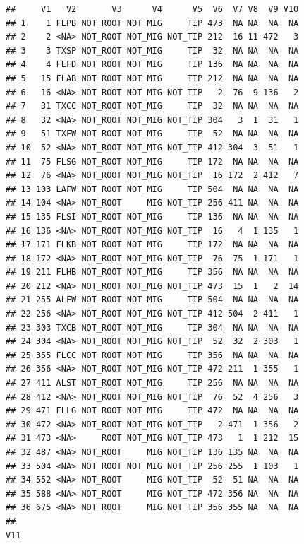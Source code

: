 \documentclass[]{article}
\begin{document}
\begin{verbatim}
##     V1   V2       V3      V4      V5  V6  V7 V8  V9 V10
## 1    1 FLPB NOT_ROOT NOT_MIG     TIP 473  NA NA  NA  NA
## 2    2 <NA> NOT_ROOT NOT_MIG NOT_TIP 212  16 11 472   3
## 3    3 TXSP NOT_ROOT NOT_MIG     TIP  32  NA NA  NA  NA
## 4    4 FLFD NOT_ROOT NOT_MIG     TIP 136  NA NA  NA  NA
## 5   15 FLAB NOT_ROOT NOT_MIG     TIP 212  NA NA  NA  NA
## 6   16 <NA> NOT_ROOT NOT_MIG NOT_TIP   2  76  9 136   2
## 7   31 TXCC NOT_ROOT NOT_MIG     TIP  32  NA NA  NA  NA
## 8   32 <NA> NOT_ROOT NOT_MIG NOT_TIP 304   3  1  31   1
## 9   51 TXFW NOT_ROOT NOT_MIG     TIP  52  NA NA  NA  NA
## 10  52 <NA> NOT_ROOT NOT_MIG NOT_TIP 412 304  3  51   1
## 11  75 FLSG NOT_ROOT NOT_MIG     TIP 172  NA NA  NA  NA
## 12  76 <NA> NOT_ROOT NOT_MIG NOT_TIP  16 172  2 412   7
## 13 103 LAFW NOT_ROOT NOT_MIG     TIP 504  NA NA  NA  NA
## 14 104 <NA> NOT_ROOT     MIG NOT_TIP 256 411 NA  NA  NA
## 15 135 FLSI NOT_ROOT NOT_MIG     TIP 136  NA NA  NA  NA
## 16 136 <NA> NOT_ROOT NOT_MIG NOT_TIP  16   4  1 135   1
## 17 171 FLKB NOT_ROOT NOT_MIG     TIP 172  NA NA  NA  NA
## 18 172 <NA> NOT_ROOT NOT_MIG NOT_TIP  76  75  1 171   1
## 19 211 FLHB NOT_ROOT NOT_MIG     TIP 356  NA NA  NA  NA
## 20 212 <NA> NOT_ROOT NOT_MIG NOT_TIP 473  15  1   2  14
## 21 255 ALFW NOT_ROOT NOT_MIG     TIP 504  NA NA  NA  NA
## 22 256 <NA> NOT_ROOT NOT_MIG NOT_TIP 412 504  2 411   1
## 23 303 TXCB NOT_ROOT NOT_MIG     TIP 304  NA NA  NA  NA
## 24 304 <NA> NOT_ROOT NOT_MIG NOT_TIP  52  32  2 303   1
## 25 355 FLCC NOT_ROOT NOT_MIG     TIP 356  NA NA  NA  NA
## 26 356 <NA> NOT_ROOT NOT_MIG NOT_TIP 472 211  1 355   1
## 27 411 ALST NOT_ROOT NOT_MIG     TIP 256  NA NA  NA  NA
## 28 412 <NA> NOT_ROOT NOT_MIG NOT_TIP  76  52  4 256   3
## 29 471 FLLG NOT_ROOT NOT_MIG     TIP 472  NA NA  NA  NA
## 30 472 <NA> NOT_ROOT NOT_MIG NOT_TIP   2 471  1 356   2
## 31 473 <NA>     ROOT NOT_MIG NOT_TIP 473   1  1 212  15
## 32 487 <NA> NOT_ROOT     MIG NOT_TIP 136 135 NA  NA  NA
## 33 504 <NA> NOT_ROOT NOT_MIG NOT_TIP 256 255  1 103   1
## 34 552 <NA> NOT_ROOT     MIG NOT_TIP  52  51 NA  NA  NA
## 35 588 <NA> NOT_ROOT     MIG NOT_TIP 472 356 NA  NA  NA
## 36 675 <NA> NOT_ROOT     MIG NOT_TIP 356 355 NA  NA  NA
##                                                                                                                                                                                                                                                                                                                                                                                                                               V11

\end{verbatim}
\end{document}
